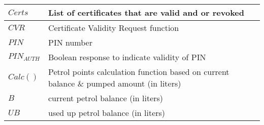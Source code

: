\begin{center}
\begin{tabular}{| l | p{8cm} |}
            $Certs$ & List of certificates that are valid and or revoked \\ \hline
            $CVR$ & Certificate Validity Request function \\ \hline
            $PIN$ & PIN number \\ \hline
            $PIN_{AUTH}$ & Boolean response to indicate validity of PIN \\ \hline
            $Calc()$ & Petrol points calculation function based on current balance \& pumped amount (in liters) \\ \hline
            $B$ & current petrol balance (in liters) \\ \hline
            $UB$ & used up petrol balance (in liters) \\ \hline
        \end{tabular}
    \end{center}